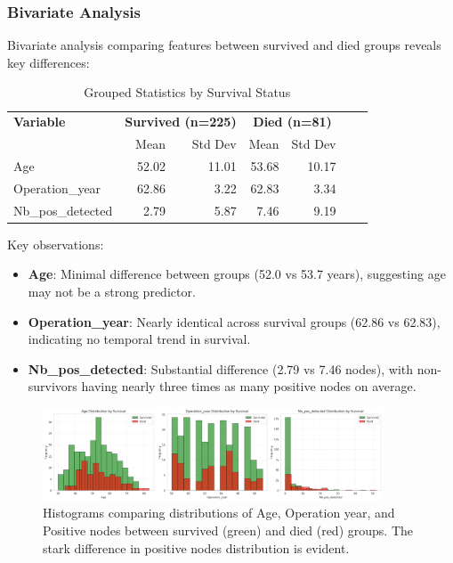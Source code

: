 \documentclass[12pt,a4paper]{article}
\begin{document}
\subsubsection{Bivariate Analysis}

Bivariate analysis comparing features between survived and died groups reveals key differences:

\begin{table}[H]
\centering
\caption{Grouped Statistics by Survival Status}
\label{tab:grouped_stats}
\begin{tabular}{lrrrrrr}
\toprule
\textbf{Variable} & \multicolumn{2}{c}{\textbf{Survived (n=225)}} & \multicolumn{2}{c}{\textbf{Died (n=81)}} \\
\cmidrule(r){2-3} \cmidrule(r){4-5}
& Mean & Std Dev & Mean & Std Dev \\
\midrule
Age & 52.02 & 11.01 & 53.68 & 10.17 \\
Operation\_year & 62.86 & 3.22 & 62.83 & 3.34 \\
Nb\_pos\_detected & 2.79 & 5.87 & 7.46 & 9.19 \\
\bottomrule
\end{tabular}
\end{table}

Key observations:
\begin{itemize}
    \item \textbf{Age}: Minimal difference between groups (52.0 vs 53.7 years), suggesting age may not be a strong predictor.
    \item \textbf{Operation\_year}: Nearly identical across survival groups (62.86 vs 62.83), indicating no temporal trend in survival.
    \item \textbf{Nb\_pos\_detected}: Substantial difference (2.79 vs 7.46 nodes), with non-survivors having nearly three times as many positive nodes on average.
\end{itemize}

\begin{figure}[H]
\centering
\includegraphics[width=0.9\textwidth]{bivariate_analysis_by_survival.png}
\caption{Histograms comparing distributions of Age, Operation year, and Positive nodes between survived (green) and died (red) groups. The stark difference in positive nodes distribution is evident.}
\label{fig:bivariate_analysis}
\end{figure}
\end{document}
